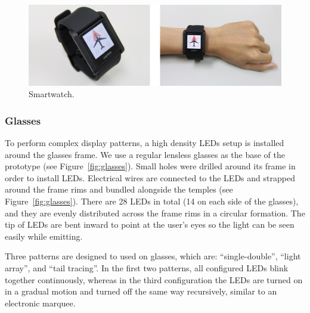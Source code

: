 \documentclass{sigchi}
\begin{document}
\begin{figure}[!b]
\centering
\includegraphics[width=0.9\columnwidth]{smartwatch_4}
\caption{Smartwatch.}
\label{fig:watch}
\end{figure}


\subsubsection{Glasses}
To perform complex display patterns, a high density LEDs setup is installed around the glasses frame. We use a regular lensless glasses as the base of the prototype (see Figure~\ref{fig:glasses}). Small holes were drilled around its frame in order to install LEDs. Electrical wires are connected to the LEDs and strapped around the frame rims and bundled alongside the temples (see Figure~\ref{fig:glasses}). There are 28 LEDs in total (14 on each side of the glasses), and they are evenly distributed across the frame rims in a circular formation. The tip of LEDs are bent inward to point at the user's eyes so the light can be seen easily while emitting.

Three patterns are designed to used on glasses, which are: \textquotedblleft single-double\textquotedblright, \textquotedblleft light array\textquotedblright, and \textquotedblleft tail tracing\textquotedblright. In the first two patterns, all configured LEDs blink together continuously, whereas in the third configuration the LEDs are turned on in a gradual motion and turned off the same way recursively, similar to an electronic marquee.
\end{document}
